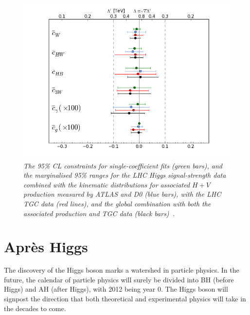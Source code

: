 \documentclass[12pt]{article}
\numberwithin{equation}{section}
\begin{document}
\begin{figure}[h!]
\centering
\includegraphics[scale=0.4]{ESY_Summary95CLbounds.png}
\caption{\it The 95\% CL constraints for single-coefficient fits (green bars),
and the marginalised 95\% ranges for the
LHC Higgs signal-strength data combined with the kinematic distributions for associated $H + V$ production
measured by ATLAS and D0 (blue bars), with the LHC TGC data (red lines), and the global combination with
both the associated production and TGC data (black bars)~\protect\cite{ESY4}.}
\label{fig:dim6}
\end{figure}

\section{Apr\`es Higgs}

The discovery of the Higgs boson marks a watershed in particle physics.
In the future, the calendar of particle physics will surely be divided into BH (before Higgs) and AH (after Higgs), with
2012 being year 0. The Higgs boson will signpost the direction that both theoretical and experimental
physics will take in the decades to come.
\end{document}
